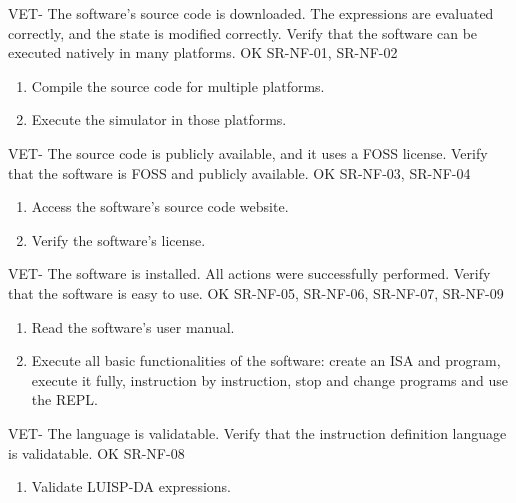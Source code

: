 \begin{testCase}{VET-}
  {The software's source code is downloaded.}  %
  {The expressions are evaluated correctly, and the state is modified correctly.}  %
  {Verify that the software can be executed natively in many platforms.}  %
  {OK}  %
  {SR-NF-01, SR-NF-02}  %
  \begin{enumerate}[leftmargin=*, topsep=0pt, noitemsep]  %
    \item Compile the source code for multiple platforms.
    \item Execute the simulator in those platforms.
  \end{enumerate}
\end{testCase}

\begin{testCase}{VET-}
  {\NA}  %
  {The source code is publicly available, and it uses a \gls{FOSS} license.}  %
  {Verify that the software is \gls{FOSS} and publicly available.}  %
  {OK}  %
  {SR-NF-03, SR-NF-04}  %
  \begin{enumerate}[leftmargin=*, topsep=0pt, noitemsep]  %
    \item Access the software's source code website.
    \item Verify the software's license.
  \end{enumerate}
\end{testCase}

\begin{testCase}{VET-}
  {The software is installed.}  %
  {All actions were successfully performed.}  %
  {Verify that the software is easy to use.}  %
  {OK}  %
  {SR-NF-05, SR-NF-06, SR-NF-07, SR-NF-09}  %
  \begin{enumerate}[leftmargin=*, topsep=0pt, noitemsep]  %
    \item Read the software's user manual.
    \item Execute all basic functionalities of the software: create an \gls{ISA} and program, execute it fully, instruction by instruction, stop and change programs and use the REPL.
  \end{enumerate}
\end{testCase}

\begin{testCase}{VET-}
  {\NA}  %
  {The language is validatable.}  %
  {Verify that the instruction definition language is validatable.}  %
  {OK}  %
  {SR-NF-08}  %
  \begin{enumerate}[leftmargin=*, topsep=0pt, noitemsep]  %
    \item Validate LUISP-DA expressions.
  \end{enumerate}
\end{testCase}


